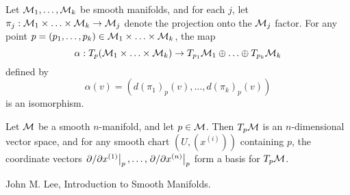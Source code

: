 \documentclass[11pt,a4paper]{article}
\begin{document}
\begin{prop}
Let $\mathcal{M}_1,\ldots,\mathcal{M}_k$ be smooth manifolds, and for each $j$, let $\pi_j:\mathcal{M}_1\times\ldots\times\mathcal{M}_k\rightarrow \mathcal{M}_j$ denote the projection onto the $\mathcal{M}_j$ factor. For any point $p = (p_1,\ldots,p_k)\in \mathcal{M}_1\times\ldots\times\mathcal{M}_k$, the map 
\begin{equation*}
    \alpha:T_p(\mathcal{M}_1\times\ldots\times\mathcal{M}_k)\rightarrow T_{p_1}\mathcal{M}_1\oplus\ldots\oplus T_{p_k}\mathcal{M}_k
\end{equation*}
defined by 
\begin{equation*}
    \alpha(v) = (d(\pi_1)_p(v),\ldots,d(\pi_k)_p(v))
\end{equation*}
is an isomorphism.
\end{prop}

\begin{prop}
Let $\mathcal{M}$ be a smooth $n$-manifold, and let $p\in \mathcal{M}$. Then $T_p\mathcal{M}$ is an $n$-dimensional vector space, and for any smooth chart $(U,(x^{(i)}))$ containing $p$, the coordinate vectors $\left.\partial/\partial x^{(1)}\right|_{p},\ldots,\left.\partial/\partial x^{(n)}\right|_{p}$ form a basis for $T_p\mathcal{M}$.
\end{prop}



\newpage

\begin{thebibliography}{9}
John M. Lee, Introduction to Smooth Manifolds.



\end{thebibliography}
\end{document}
